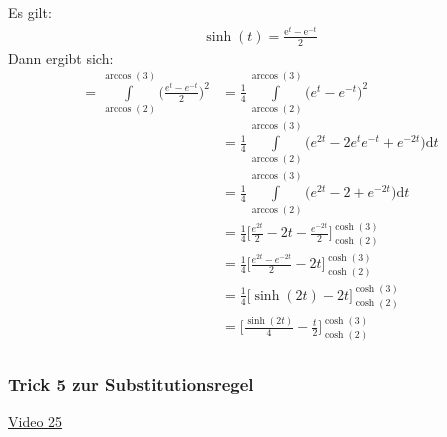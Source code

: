 Es gilt:\\
\begin{align*}
\sinh(t)=\frac{\mathrm{e}^t-\mathrm{e}^{-t}}{2}
\end{align*}
Dann ergibt sich:\\
\begin{align*}
=\int\limits_{\arccos(2)}^{\arccos(3)}\bigg(\frac{e^t-e^{-t}}{2}\bigg)^2&=\frac{1}{4}\int\limits_{\arccos(2)}^{\arccos(3)}\big(e^t-e^{-t}\big)^2\\
&=\frac{1}{4}\int\limits_{\arccos(2)}^{\arccos(3)}\bigg(e^{2t}-2e^te^{-t}+e^{-2t}\bigg)\mathrm{d}t\\
&=\frac{1}{4}\int\limits_{\arccos(2)}^{\arccos(3)}\bigg(e^{2t}-2+e^{-2t}\bigg)\mathrm{d}t\\
&=\frac{1}{4}\bigg[\frac{e^{2t}}{2}-2t-\frac{e^{-2t}}{2}\bigg]^{\cosh(3)}_{\cosh(2)}\\
&=\frac{1}{4}\bigg[\frac{e^{2t}-e^{-2t}}{2}-2t\bigg]^{\cosh(3)}_{\cosh(2)}\\
&=\frac{1}{4}\bigg[\sinh(2t)-2t\bigg]^{\cosh(3)}_{\cosh(2)}\\
&=\bigg[\frac{\sinh(2t)}{4}-\frac{t}{2}\bigg]^{\cosh(3)}_{\cosh(2)}\\
\end{align*}
\subsubsection{Trick 5 zur Substitutionsregel}
\href{https://youtu.be/AvuezkKpOus}{Video 25}\\

